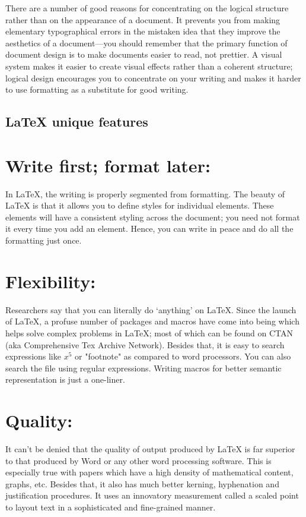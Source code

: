 \documentclass[12pt, document]{article}
\begin{document}
There are a number of good reasons for concentrating on the logical structure rather than on the appearance of a document. It prevents you from making elementary typographical errors in the mistaken idea that they improve the aesthetics of a document---you should remember that the primary function of document design is to make documents easier to read, not prettier. A visual system makes it easier to create visual effects rather than a coherent structure; logical design encourages you to concentrate on your writing and makes it harder to use formatting as a substitute for good writing.
\vspace{3cm}

\begin{center}
\chapter{\textbf{LaTeX unique features}}
\end{center}
\vspace{1cm}

\chapter{\textbf{Write first; format later: }}
In LaTeX, the writing is properly segmented from formatting. The beauty of LaTeX is that it allows you to define styles for individual elements. These elements will have a consistent styling across the document; you need not format it every time you add an element. Hence, you can write in peace and do all the formatting just once.

\chapter{\textbf{Flexibility:}}
Researchers say that you can literally do ‘anything’ on LaTeX. Since the launch of LaTeX, a profuse number of packages and macros have come into being which helps solve complex problems in LaTeX; most of which can be found on CTAN (aka Comprehensive Tex Archive Network). Besides that, it is easy to search expressions like $x^5$ or "footnote" as compared to word processors. You can also search the file using regular expressions. Writing macros for better semantic representation is just a one-liner.
\thispagestyle{empty}

\chapter{\textbf{Quality:}}
It can’t be denied that the quality of output produced by LaTeX is far superior to that produced by Word or any other word processing software. This is especially true with papers which have a high density of mathematical content, graphs, etc. Besides that, it also has much better kerning, hyphenation and justification procedures. It uses an innovatory measurement called a scaled point to layout text in a sophisticated and fine-grained manner.
\end{document}
